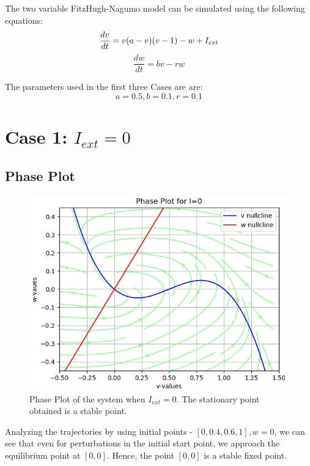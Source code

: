 \documentclass[12pt,a4paper]{article}
\begin{document}
The two variable FitzHugh-Nagumo model can be simulated using the following equations:
$$
\frac{dv}{dt} = v(a-v)(v-1) - w + I_{ext}\\
$$
$$
\frac{dw}{dt} = bv-rw
$$

The parameters used in the first three Cases are are:
$$
a = 0.5,  b = 0.1, r = 0.1
$$

\section{Case 1: $I_{ext} = 0$}
\subsection{Phase Plot}
	\begin{figure}[H]
	\centering
	\includegraphics[scale=0.6]{images/Figure_1.png}
	\caption{Phase Plot of the system when $I_{ext} =  0$. The stationary point obtained is a stable point.}
	\end{figure}

	Analyzing the trajectories by using initial points - $[0, 0.4, 0.6, 1], w=0$, we can see that even for perturbations in the initial start point, we approach the equilibrium point at $[0,0]$. Hence, the point $[0,0]$ is a stable fixed point.
\end{document}
